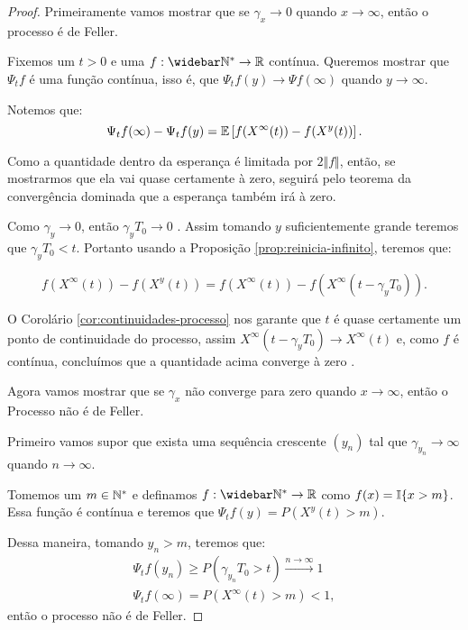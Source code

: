 \begin{proof}

  Primeiramente vamos mostrar que se $\gamma_x \to 0$ quando $x \to
  \infty$, então o processo é de Feller.

  Fixemos um $t > 0$ e uma $f: \Nzb \to \R$ contínua. Queremos mostrar
  que $\Psi_t f$ é uma função contínua, isso é, que $\Psi_t f(y) \to
  \Psi f (\infty)$ quando $y \to \infty$.

  Notemos que:
  \begin{displaymath}
    \Psi_t f(\infty) - \Psi_t f (y) =
    {\mathbb{E}} \left[
      f(X^\infty(t)) - f(X^y(t))
    \right].
  \end{displaymath}

  Como a quantidade dentro da esperança é limitada por $2 \Vert f
  \Vert$, então, se mostrarmos que ela vai quase certamente à zero,
  seguirá pelo teorema da convergência dominada que a esperança também
  irá à zero.

  Como $\gamma_y \to 0$, então $\gamma_y T_0 \to 0$ \qc. Assim tomando
  $y$ suficientemente grande teremos que $\gamma_y T_0 < t$. Portanto
  usando a Proposição \ref{prop:reinicia-infinito}, teremos que:

  \begin{displaymath}
    f(X^\infty(t)) - f(X^y(t)) = 
    f(X^\infty(t)) - f(X^\infty(t-\gamma_y T_0)).
  \end{displaymath}

  O Corolário \ref{cor:continuidades-processo} nos garante que $t$ é
  quase certamente um ponto de continuidade do processo, assim
  $X^\infty(t-\gamma_y T_0) \to X^\infty(t)$ \qc e, como $f$ é
  contínua, concluímos que a quantidade acima converge à zero \qc.


  Agora vamos mostrar que se $\gamma_x$ não converge para zero quando
  $x \to \infty$, então o Processo não é de Feller.

  Primeiro vamos supor que exista uma sequência crescente $(y_n)$ tal
  que $\gamma_{y_n} \to \infty$ quando $n \to \infty$.

  Tomemos um $m \in {\mathbb{N^*}}$ e definamos $f: \Nzb \to \R$ como $f(x) =
  {\mathbb{I}} \{ x > m \}$. Essa função é contínua e teremos que $\Psi_t f
  (y) = P\left( X^y(t) > m \right)$.

  Dessa maneira, tomando $y_n > m$, teremos que:
  \begin{gather*}
    \Psi_t f(y_n) \geq P(\gamma_{y_n} T_0 > t) \xrightarrow{n \to
      \infty} 1\\
    \Psi_t f(\infty) = P(X^{\infty}(t) > m) < 1, 
  \end{gather*}
  então o processo não é de Feller.
  


\end{proof}
